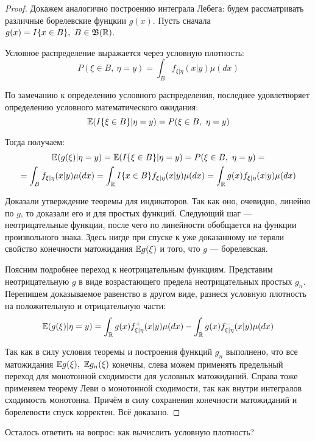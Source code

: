 \begin{proof}
    Докажем аналогично построению интеграла Лебега: будем рассматривать различные борелевские фунцкии $g(x)$. Пусть сначала $g(x) = I\{x \in B\},\ B \in \mathfrak{B}(\mathbb{R})$.
    
    Условное распределение выражается через условную плотность:
    \[
        P(\xi \in B,\ \eta = y) = \int_B f_{\xi | \eta}(x | y) \mu(dx)
    \]

    По замечанию к определению условного распределения, последнее удовлетворяет определению условного математического ожидания:
    \[
        \E(I\{\xi \in B\} | \eta = y) = P(\xi \in B,\ \eta = y)
    \]
    
    Тогда получаем:
    \begin{multline*}
        \mathbb{E}(g(\xi) | \eta=y) = \mathbb{E}(I\{\xi \in B\} | \eta = y) = P(\xi \in B,\ \eta = y) =
        \\
        = \int_B f_{\xi | \eta}(x | y) \mu(dx) = \int_{\mathbb{R}} I\{x \in B\} f_{\xi | \eta}(x | y) \mu(dx) = \int_{\mathbb{R}} g(x) f_{\xi | \eta}(x | y) \mu(dx)
    \end{multline*}

    Доказали утверждение теоремы для индикаторов. Так как оно, очевидно, линейно по $g$, то доказали его и для простых функций. Следующий шаг --- неотрицательные функции, после чего по линейности обобщается на функции произвольного знака. Здесь нигде при спуске к уже доказанному не теряли свойство конечности матожидания $\mathbb{E} g(\xi)$ и того, что $g$ --- борелевская.

    Поясним подробнее переход к неотрицательным функциям. Представим неотрицательную $g$ в виде возрастающего предела неотрицательных простых $g_n$. Перепишем доказываемое равенство в другом виде, разнеся условную плотность на положительную и отрицательную части:
    \[
        \mathbb{E}(g(\xi) | \eta = y) = \int_{\mathbb{R}} g(x) f^+_{\xi | \eta}(x | y) \mu(dx) - \int_{\mathbb{R}} g(x) f^-_{\xi | \eta}(x | y) \mu(dx)
    \]

    Так как в силу условия теоремы и построения функций $g_n$ выполнено, что все матожидания $\mathbb{E} g(\xi),\ \mathbb{E} g_n(\xi)$ конечны, слева можем применять предельный переход для монотонной сходимости для условных матожиданий. Справа тоже применяем теорему Леви о монотонной сходимости, так как внутри интегралов сходимость монотонна. Причём в силу сохранения конечности матожиданий и борелевости спуск корректен. Всё доказано.
\end{proof}

\begin{note}
    Осталось ответить на вопрос: как вычислить условную плотность?
\end{note}


